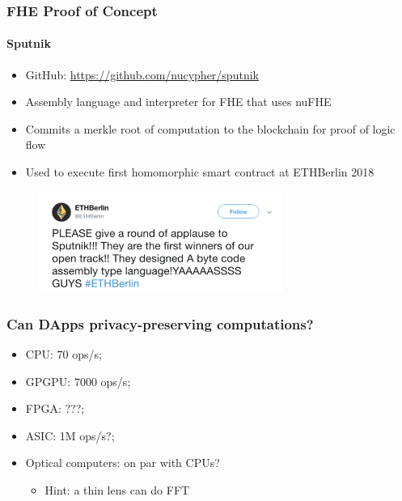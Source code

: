 \documentclass[xetex,mathsans,sans,aspectratio=169]{beamer}
\begin{document}
    \begin{frame}
      \frametitle{FHE Proof of Concept}
      \framesubtitle{Sputnik}
      \begin{itemize}
        \item GitHub: \url{https://github.com/nucypher/sputnik}
        \item Assembly language and interpreter for FHE that uses nuFHE
        \item Commits a merkle root of computation to the blockchain for proof of logic flow
        \item Used to execute first homomorphic smart contract at ETHBerlin 2018
      \end{itemize}
      \begin{figure}
        \centering
        \includegraphics[width=8cm]{pdf/sputnik-tweet.pdf}
      \end{figure}
    \end{frame}

    \begin{frame}
        \frametitle{Can DApps privacy-preserving computations?}
        \begin{itemize}
            \item CPU: $70$ ops/s;
            \item GPGPU: $7000$ ops/s;
            \item FPGA: ???;
            \item ASIC: 1M ops/s?;
            \item Optical computers: on par with CPUs?
            \begin{itemize}
                \item Hint: a thin lens can do FFT
            \end{itemize}
        \end{itemize}
    \end{frame}
\end{document}
